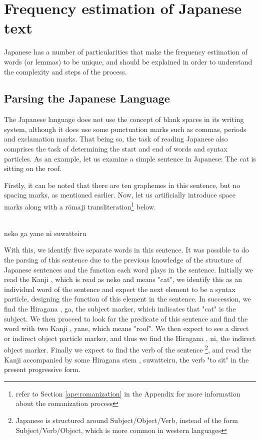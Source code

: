 \section{Frequency estimation of Japanese text}
Japanese has a number of particularities that make the frequency estimation of words (or lemmas) to be unique, and should be explained in order to understand the complexity and steps of the process.

\subsection{Parsing the Japanese Language}\label{freq:parsing}
The Japanese language does not use the concept of blank spaces in its writing system, although it does use some punctuation marks such as commas, periods and exclamation marks. That being so, the task of reading Japanese also comprises the task of determining the start and end of words and syntax particles.
As an example, let us examine a simple sentence in Japanese: The cat is sitting on the roof.

\begin{center}
\end{center}

Firstly, it can be noted that there are ten graphemes in this sentence, but no spacing marks, as mentioned earlier. Now, let us artificially introduce space marks along with a r\={o}maji transliteration\footnote{refer to Section \ref{ape:romanization} in the Appendix for more information about the romanization process} below.

\begin{center}
\\
neko ga yane ni suwatteiru
\end{center}

With this, we identify five separate words in this sentence. It was possible to do the parsing of this sentence due to the previous knowledge of the structure of Japanese sentences and the function each word plays in the sentence. Initially we read the Kanji , which is read as neko and means "cat", we identify this as an individual word of the sentence and expect the next element to be a syntax particle, designing the function of this element in the sentence. In succession, we find the Hiragana , ga, the subject marker, which indicates that "cat" is the subject. We then proceed to look for the predicate of this sentence and find the word with two Kanji , yane, which means "roof". We then expect to see a direct or indirect object particle marker, and thus we find the Hiragana , ni, the indirect object marker. Finally we expect to find the verb of the sentence
\footnote{Japanese is structured around Subject/Object/Verb, instead of the form Subject/Verb/Object, which is more common in western languages}, 
and read the Kanji accompanied by some Hiragana stem , suwatteiru, the verb "to sit" in the present progressive form.

